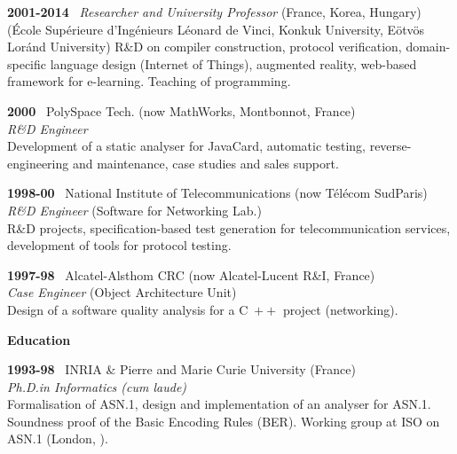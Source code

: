 \documentclass[a4paper,11pt]{article}
\newcommand{\cpp}{\mbox{C \hspace*{-2.5mm} \raise 0.7mm \hbox{${\scriptscriptstyle ++}$}}}
\begin{document}
\bigskip

\noindent\textbf{2001-2014} \ \textsf{\emph{Researcher and University
    Professor}} (France, Korea, Hungary)\\ (\textsf{\'Ecole
  Sup\'erieure d'Ing\'enieurs L\'eonard de Vinci}, \textsf{Konkuk
  University}, \textsf{E\"otv\"os Lor\'and University}) R\&D on
compiler construction, protocol verification, domain\hyp{}specific language
design (Internet of Things), augmented reality, web-based framework
for e-learning. Teaching of programming.

\bigskip

\noindent\textbf{2000} \ \textsf{PolySpace Tech.\@} (now MathWorks,
Montbonnot, France)\\ \emph{R\&D Engineer}\\ Development of a static
analyser for JavaCard, automatic testing, reverse\hyp{}engineering and
maintenance, case studies and sales support.

\bigskip

\noindent\textbf{1998-00} \ \textsf{National Institute of
  Telecommunications} (now T\'el\'ecom SudParis)\\ \emph{R\&D
  Engineer} (Software for Networking Lab.)\\ R\&D projects,
specification-based test generation for telecommunication services,
development of tools for protocol testing.

\bigskip

\noindent\textbf{1997-98} \ \textsf{Alcatel-Alsthom CRC} (now
Alcatel-Lucent R\&I, France)\\ \emph{Case Engineer} (Object
Architecture Unit)\\ Design of a software quality analysis for a
\cpp{} project (networking).

\bigskip
\noindent\textbf{\large Education}
\bigskip

\noindent\textbf{1993-98} \ \textsf{INRIA \& Pierre and Marie Curie
  University} (France)\\ \emph{Ph.D.\@ in Informatics (cum
laude)}\\ Formalisation of ASN.1, design and implementation of an
analyser for ASN.1. Soundness proof of the Basic Encoding Rules
(BER). Working group at ISO on ASN.1 (London, ).
\end{document}
